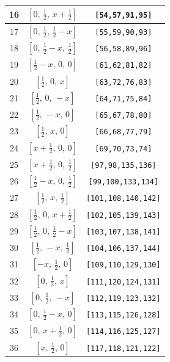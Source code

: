 \documentclass[fleqn,8pt]{jsarticle}
\begin{document}
\begin{longtable}{ccc}
16 & $\left[ 0,\, \frac{1}{2},\, x + \frac{1}{2} \right]$ & {\tt [54,57,91,95]} \\ \hline
17 & $\left[ 0,\, \frac{1}{2},\, \frac{1}{2} - x \right]$ & {\tt [55,59,90,93]} \\ \hline
18 & $\left[ 0,\, \frac{1}{2} - x,\, \frac{1}{2} \right]$ & {\tt [56,58,89,96]} \\ \hline
19 & $\left[ \frac{1}{2} - x,\, 0,\, 0 \right]$ & {\tt [61,62,81,82]} \\ \hline
20 & $\left[ \frac{1}{2},\, 0,\, x \right]$ & {\tt [63,72,76,83]} \\ \hline
21 & $\left[ \frac{1}{2},\, 0,\, - x \right]$ & {\tt [64,71,75,84]} \\ \hline
22 & $\left[ \frac{1}{2},\, - x,\, 0 \right]$ & {\tt [65,67,78,80]} \\ \hline
23 & $\left[ \frac{1}{2},\, x,\, 0 \right]$ & {\tt [66,68,77,79]} \\ \hline
24 & $\left[ x + \frac{1}{2},\, 0,\, 0 \right]$ & {\tt [69,70,73,74]} \\ \hline
25 & $\left[ x + \frac{1}{2},\, 0,\, \frac{1}{2} \right]$ & {\tt [97,98,135,136]} \\ \hline
26 & $\left[ \frac{1}{2} - x,\, 0,\, \frac{1}{2} \right]$ & {\tt [99,100,133,134]} \\ \hline
27 & $\left[ \frac{1}{2},\, x,\, \frac{1}{2} \right]$ & {\tt [101,108,140,142]} \\ \hline
28 & $\left[ \frac{1}{2},\, 0,\, x + \frac{1}{2} \right]$ & {\tt [102,105,139,143]} \\ \hline
29 & $\left[ \frac{1}{2},\, 0,\, \frac{1}{2} - x \right]$ & {\tt [103,107,138,141]} \\ \hline
30 & $\left[ \frac{1}{2},\, - x,\, \frac{1}{2} \right]$ & {\tt [104,106,137,144]} \\ \hline
31 & $\left[ - x,\, \frac{1}{2},\, 0 \right]$ & {\tt [109,110,129,130]} \\ \hline
32 & $\left[ 0,\, \frac{1}{2},\, x \right]$ & {\tt [111,120,124,131]} \\ \hline
33 & $\left[ 0,\, \frac{1}{2},\, - x \right]$ & {\tt [112,119,123,132]} \\ \hline
34 & $\left[ 0,\, \frac{1}{2} - x,\, 0 \right]$ & {\tt [113,115,126,128]} \\ \hline
35 & $\left[ 0,\, x + \frac{1}{2},\, 0 \right]$ & {\tt [114,116,125,127]} \\ \hline
36 & $\left[ x,\, \frac{1}{2},\, 0 \right]$ & {\tt [117,118,121,122]} \\ \hline

\end{longtable}
\end{document}
